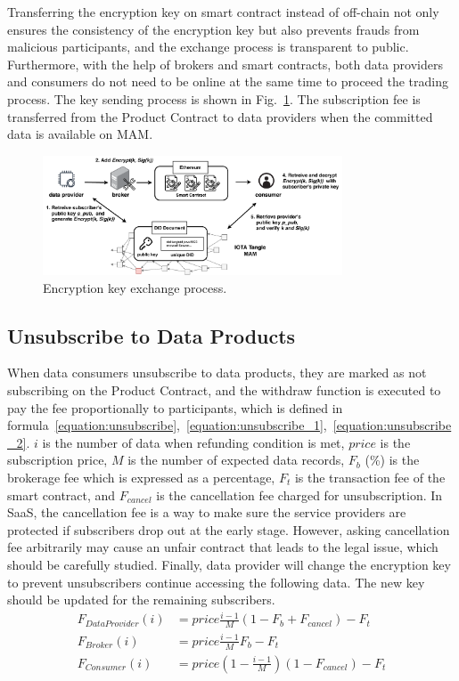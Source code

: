 \documentclass[conference]{IEEEtran}
\begin{document}
Transferring the encryption key on smart contract instead of off-chain not only ensures the consistency of the encryption key but also prevents frauds from malicious participants, and the exchange process is transparent to public. Furthermore, with the help of brokers and smart contracts, both data providers and consumers do not need to be online at the same time to proceed the trading process. The key sending process is shown in Fig.~\ref{fig:key_exchange}. The subscription fee is transferred from the Product Contract to data providers when the committed data is available on MAM.

\begin{figure}[!t]
    \centering
    \includegraphics[width=3.5in]{key_exchange_reorganize}
    \caption{Encryption key exchange process.}
    \label{fig:key_exchange}
\end{figure}

\subsection{Unsubscribe to Data Products}
When data consumers unsubscribe to data products, they are marked as not subscribing on the Product Contract, and the withdraw function is executed to pay the fee proportionally to participants, which is defined in formula~\ref{equation:unsubscribe},~\ref{equation:unsubscribe_1},~\ref{equation:unsubscribe_2}. $i$ is the number of data when refunding condition is met, $price$  is the subscription price, $M$ is the number of expected data records, $F_{b}$ (\%) is the brokerage fee which is expressed as a percentage, $F_{t}$ is the transaction fee of the smart contract, and $F_{cancel}$ is the cancellation fee charged for unsubscription. In SaaS, the cancellation fee is a way to make sure the service providers are protected if subscribers drop out at the early stage. However, asking cancellation fee arbitrarily may cause an unfair contract that leads to the legal issue, which should be carefully studied. Finally, data provider will change the encryption key to prevent unsubscribers continue accessing the following data. The new key should be updated for the remaining subscribers.
\begin{align}
    F_{DataProvider}(i) &= price \frac{i-1}{M} (1-F_{b}+F_{cancel}) -F_{t} \label{equation:unsubscribe} \\
    F_{Broker}(i) &= price \frac{i-1}{M} F_{b} -F_{t} \label{equation:unsubscribe_1} \\
    F_{Consumer}(i) &= price (1-\frac{i-1}{M})(1 -F_{cancel}) -F_{t} \label{equation:unsubscribe_2}
\end{align}
\end{document}
